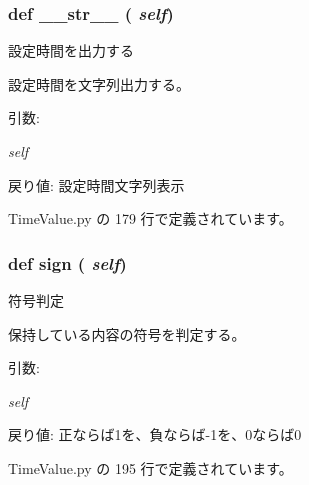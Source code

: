 \subsubsection{\setlength{\rightskip}{0pt plus 5cm}def \_\-\_\-str\_\-\_\- ( {\em self})}\label{classsource__py_1_1_time_value_1_1_time_value_a7a4b9bc0941308e362738503137460e}


設定時間を出力する 

設定時間を文字列出力する。\par


\begin{Desc}
\item[引数:]
\begin{description}
\item[{\em self}]\end{description}
\end{Desc}
\begin{Desc}
\item[戻り値:]設定時間文字列表示 \end{Desc}


 TimeValue.py の 179 行で定義されています。
\subsubsection{\setlength{\rightskip}{0pt plus 5cm}def sign ( {\em self})}\label{classsource__py_1_1_time_value_1_1_time_value_829294da9721843dcd38d5ca8f775550}


符号判定 

保持している内容の符号を判定する。\par


\begin{Desc}
\item[引数:]
\begin{description}
\item[{\em self}]\end{description}
\end{Desc}
\begin{Desc}
\item[戻り値:]正ならば1を、負ならば-1を、0ならば0 \end{Desc}


 TimeValue.py の 195 行で定義されています。